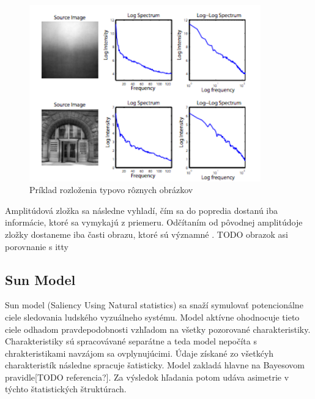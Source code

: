 \begin{figure}[H]
  \centering
  \includegraphics[width=10cm]{pics/spectral-rezidual-1.png}
  \caption{Príklad rozloženia typovo rôznych obrázkov}\label{wrap-fig:2}
\end{figure}
\vspace{10mm}

Amplitúdová zložka sa následne vyhladí, čím sa do popredia dostanú iba informácie, ktoré sa vymykajú z priemeru. Odčítaním od pôvodnej amplitúdoje zložky dostaneme iba časti obrazu, ktoré sú významné \cite{spectral-rezidual}.
TODO obrazok asi porovnanie s itty
\subsection{Sun Model}
Sun model (Saliency Using Natural statistics) sa snaží symulovať potencionálne ciele sledovania ludského vyzuálneho systému. Model aktívne ohodnocuje tieto ciele odhadom pravdepodobnosti vzhľadom na všetky pozorované charakteristiky. Charakteristiky sú spracovávané separátne a teda model nepočíta s chrakteristikami navzájom sa ovplynujúcimi. Údaje získané zo všetkćyh charakteristík  následne spracuje šatisticky. Model zakladá hlavne na Bayesovom pravidle[TODO referencia?]. Za výsledok hľadania potom udáva asimetrie v týchto štatistických štruktúrach\cite{sun-1}.
